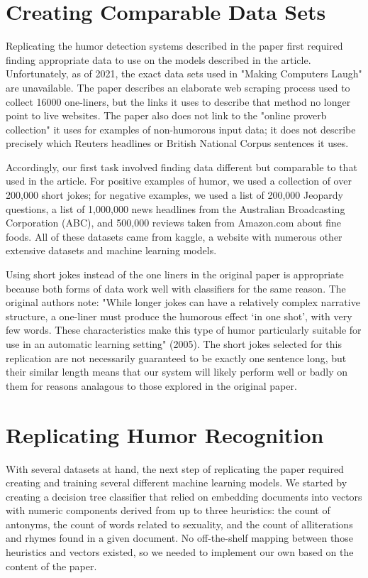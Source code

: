 \documentclass[11pt,a4paper]{article}
\begin{document}
\section{Creating Comparable Data Sets}
Replicating the humor detection systems described in the paper first required finding appropriate data to use on the models described in the article. Unfortunately, as of 2021, the exact data sets used in "Making Computers Laugh" are unavailable. The paper describes an elaborate web scraping process used to collect 16000 one-liners, but the links it uses to describe that method no longer point to live websites. The paper also does not link to the "online proverb collection" it uses for examples of non-humorous input data; it does not describe precisely which Reuters headlines or British National Corpus sentences it uses.

Accordingly, our first task involved finding data different but comparable to that used in the article. For positive examples of humor, we used a collection of over 200,000 short jokes; for negative examples, we used a list of 200,000 Jeopardy questions, a list of 1,000,000 news headlines from the Australian Broadcasting Corporation (ABC), and 500,000 reviews taken from Amazon.com about fine foods. \cite{short-jokes} \cite{news-headlines} \cite{jeopardy-questions} \cite{amazon-reviews} All of these datasets came from kaggle, a website with numerous other extensive datasets and machine learning models.

Using short jokes instead of the one liners in the original paper is appropriate because both forms of data work well with classifiers for the same reason. The original authors note: "While longer jokes can have a relatively complex narrative structure, a one-liner must produce the humorous effect `in one shot', with very few words. These characteristics make this type of humor particularly suitable for use in an automatic learning setting" (2005). The short jokes selected for this replication are not necessarily guaranteed to be exactly one sentence long, but their similar length means that our system will likely perform well or badly on them for reasons analagous to those explored in the original paper.

\section{Replicating Humor Recognition}
With several datasets at hand, the next step of replicating the paper required creating and training several different machine learning models. We started by creating a decision tree classifier that relied on embedding documents into vectors with numeric components derived from up to three heuristics: the count of antonyms, the count of words related to sexuality, and the count of alliterations and rhymes found in a given document. No off-the-shelf mapping between those heuristics and vectors existed, so we needed to implement our own based on the content of the paper.
\end{document}
